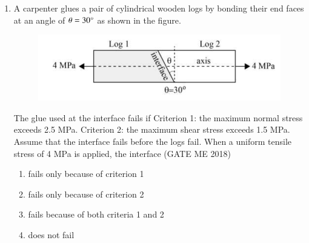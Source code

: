 \documentclass[journal]{IEEEtran}
\numberwithin{equation}{enumi}
\numberwithin{figure}{enumi}
\begin{document}
\begin{enumerate}
    \item A carpenter glues a pair of cylindrical wooden logs by bonding their end faces at an angle
of $\theta=30\degree$ as shown in the figure.
\begin{figure}[H]
    \centering
    \includegraphics[width = 0.6\columnwidth]{figs/fig3.7.png}
    \caption*{}
    \label{fig:Q31}
    \end{figure}
The glue used at the interface fails if
Criterion 1: the maximum normal stress exceeds 2.5 MPa.
Criterion 2: the maximum shear stress exceeds 1.5 MPa.
Assume that the interface fails before the logs fail. When a uniform tensile stress of 4 MPa is applied, the interface
\hfill{(GATE ME 2018)}
\begin{enumerate}
    \item  fails only because of criterion 1
\item fails only because of criterion 2
\item  fails because of both criteria 1 and 2
\item  does not fail
\end{enumerate}


\end{enumerate}
\end{document}
